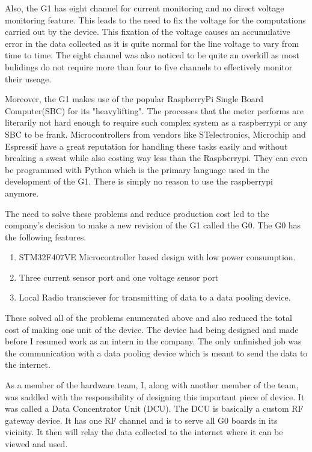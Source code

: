 Also, the G1 has eight channel for current monitoring and no direct voltage monitoring feature. This leads to the need to fix the voltage for the computations carried out by the device. This fixation of the voltage causes an accumulative error in the data collected as it is quite normal for the line voltage to vary from time to time. The eight channel was also noticed to be quite an overkill as most bulidings do not require more than four to five channels to effectively monitor their useage.

Moreover, the G1 makes use of the popular RaspberryPi Single Board Computer(SBC) for its "heavylifting". The processes that the meter performs are literarily not hard enough to require such complex system as a raspberrypi or any SBC to be frank. Microcontrollers from vendors like STelectronics, Microchip and Espressif have a great reputation for handling these tasks easily and without breaking a sweat while also costing way less than the Raspberrypi. They can even be programmed with Python which is the primary language used in the development of the G1. There is simply no reason to use the raspberrypi anymore.

The need to solve these problems and reduce production cost led to the company's decision to make a new revision of the G1 called the G0. The G0 has the following features.
\begin{enumerate}
\item STM32F407VE Microcontroller based design with low power consumption.
\item Three current sensor port and one voltage sensor port
\item Local Radio transciever for transmitting of data to a data pooling device.
\end{enumerate}
These solved all of the problems enumerated above and also reduced the total cost of making one unit of the device. The device had being designed and made before I resumed work as an intern in the company. The only unfinished job was the communication with a data pooling device which is meant to send the data to the internet.

As a member of the hardware team, I, along with another member of the team, was saddled with the responsibility of designing this important piece of device. It was called a Data Concentrator Unit (DCU). The DCU is basically a custom RF gateway device. It has one RF channel and is to serve all G0 boards in its vicinity. It then will relay the data collected to the internet where it can be viewed and used.

